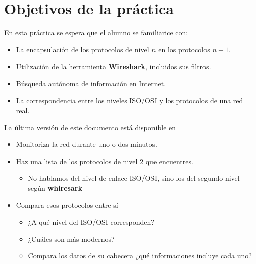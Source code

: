 

\renewcommand{\hmwkTitle}{Análisis de tráfico con \textbf{Wireshark}}

\renewcommand{\hmwkClass}{Plan. y Admin. de Redes}




\primerapagina


\section{Objetivos de la práctica}
En esta práctica se espera que el alumno se familiarice con:
\begin{itemize}
\item La encapsulación de los protocolos de nivel $n$ en los protocolos $n-1$.
\item Utilización de la herramienta \textbf{Wireshark}, incluidos sus filtros.
\item Búsqueda autónoma de información en Internet.
\item La correspondencia entre los niveles ISO/OSI y los protocolos de una red real.
  
\end{itemize}

La última versión de este documento está disponible en 

\begin{homeworkProblem}

  \begin{itemize}
  \item Monitoriza la red durante uno o dos minutos. 
  \item Haz una lista de los protocolos de nivel 2 que encuentres.
    \begin{itemize}
    \item \small{No hablamos del nivel de enlace ISO/OSI, sino los del segundo nivel según  \textbf{whiresark}}
    \end{itemize}
  \item Compara esos protocolos entre sí
    \begin{itemize}
    \item ¿A qué nivel del ISO/OSI corresponden?
    \item ¿Cuáles son más modernos?
    \item Compara los datos de su cabecera ¿qué informaciones incluye cada uno?
    \end{itemize}
  \end{itemize}
  
\end{homeworkProblem}


